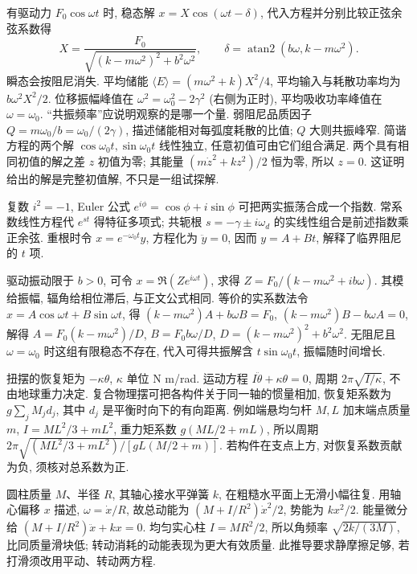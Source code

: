 有驱动力 $F_0\cos\omega t$ 时, 稳态解 $x=X\cos(\omega t-\delta)$, 代入方程并分别比较正弦余弦系数得
\begin{equation}
X=\frac{F_0}{\sqrt{(k-m\omega^2)^2+b^2\omega^2}},\qquad
\delta=\operatorname{atan2}(b\omega,k-m\omega^2).
\end{equation}
瞬态会按阻尼消失. 平均储能 $\langle E\rangle=(m\omega^2+k)X^2/4$, 平均输入与耗散功率均为 $b\omega^2X^2/2$. 位移振幅峰值在 $\omega^2=\omega_0^2-2\gamma^2$ (右侧为正时), 平均吸收功率峰值在 $\omega=\omega_0$. “共振频率”应说明观察的是哪一个量. 弱阻尼品质因子 $Q=m\omega_0/b=\omega_0/(2\gamma)$, 描述储能相对每弧度耗散的比值; $Q$ 大则共振峰窄.
简谐方程的两个解 $\cos\omega_0t,\sin\omega_0t$ 线性独立, 任意初值可由它们组合满足. 两个具有相同初值的解之差 $z$ 初值为零; 其能量 $(m\dot z^2+kz^2)/2$ 恒为零, 所以 $z=0$. 这证明给出的解是完整初值解, 不只是一组试探解.

复数 $i^2=-1$, Euler 公式 $e^{i\phi}=\cos\phi+i\sin\phi$ 可把两实振荡合成一个指数. 常系数线性方程代 $e^{st}$ 得特征多项式; 共轭根 $s=-\gamma\pm i\omega_d$ 的实线性组合是前述指数乘正余弦. 重根时令 $x=e^{-\omega_0t}y$, 方程化为 $\ddot y=0$, 因而 $y=A+Bt$, 解释了临界阻尼的 $t$ 项.

驱动振动限于 $b>0$, 可令 $x=\Re(Ze^{i\omega t})$, 求得 $Z=F_0/(k-m\omega^2+ib\omega)$. 其模给振幅, 辐角给相位滞后, 与正文公式相同. 等价的实系数法令 $x=A\cos\omega t+B\sin\omega t$, 得 $(k-m\omega^2)A+b\omega B=F_0$, $(k-m\omega^2)B-b\omega A=0$, 解得 $A=F_0(k-m\omega^2)/D$, $B=F_0b\omega/D$, $D=(k-m\omega^2)^2+b^2\omega^2$. 无阻尼且 $\omega=\omega_0$ 时这组有限稳态不存在, 代入可得共振解含 $t\sin\omega_0t$, 振幅随时间增长.

扭摆的恢复矩为 $-\kappa\theta$, $\kappa$ 单位 N m/rad. 运动方程 $I\ddot\theta+\kappa\theta=0$, 周期 $2\pi\sqrt{I/\kappa}$, 不由地球重力决定. 复合物理摆可把各构件关于同一轴的惯量相加, 恢复矩系数为 $g\sum_jM_jd_j$, 其中 $d_j$ 是平衡时向下的有向距离. 例如端悬均匀杆 $M,L$ 加末端点质量 $m$, $I=ML^2/3+mL^2$, 重力矩系数 $g(ML/2+mL)$, 所以周期 $2\pi\sqrt{(ML^2/3+mL^2)/[gL(M/2+m)]}$. 若构件在支点上方, 对恢复系数贡献为负, 须核对总系数为正.

圆柱质量 $M$、半径 $R$, 其轴心接水平弹簧 $k$, 在粗糙水平面上无滑小幅往复. 用轴心偏移 $x$ 描述, $\omega=\dot x/R$, 故总动能为 $(M+I/R^2)\dot x^2/2$, 势能为 $kx^2/2$. 能量微分给 $(M+I/R^2)\ddot x+kx=0$. 均匀实心柱 $I=MR^2/2$, 所以角频率 $\sqrt{2k/(3M)}$, 比同质量滑块低; 转动消耗的动能表现为更大有效质量. 此推导要求静摩擦足够, 若打滑须改用平动、转动两方程.

